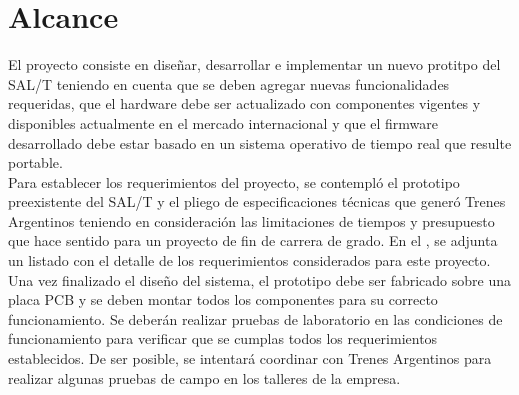 \section{Alcance}



El proyecto consiste en diseñar, desarrollar e implementar un nuevo protitpo del SAL/T teniendo en cuenta que se deben agregar nuevas funcionalidades requeridas, que el hardware debe ser actualizado con componentes vigentes y disponibles actualmente en el mercado internacional y que el firmware desarrollado debe estar basado en un sistema operativo de tiempo real que resulte portable. \\

Para establecer los requerimientos del proyecto, se contempló el prototipo preexistente del SAL/T y el pliego de especificaciones técnicas que generó Trenes Argentinos teniendo en consideración las limitaciones de tiempos y presupuesto que hace sentido para un proyecto de fin de carrera de grado. En el , se adjunta un listado con el detalle de los requerimientos considerados para este proyecto.\\

Una vez finalizado el diseño del sistema, el prototipo debe ser fabricado sobre una placa PCB y se deben montar todos los componentes para su correcto funcionamiento. Se deberán realizar pruebas de laboratorio en las condiciones de funcionamiento para verificar que se cumplas todos los requerimientos establecidos. De ser posible, se intentará coordinar con Trenes Argentinos para realizar algunas pruebas de campo en los talleres de la empresa. 

